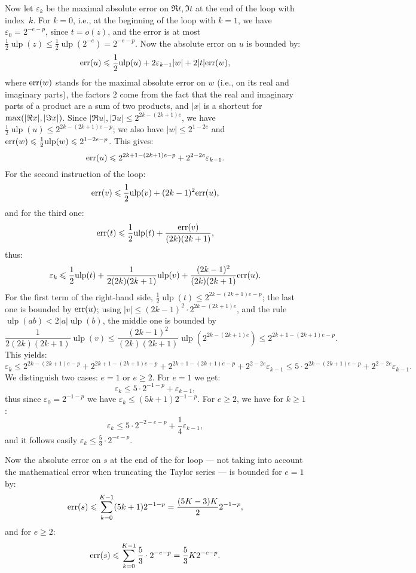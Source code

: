 \documentclass [11pt]{article}
\newcommand {\Ulp}{{\operatorname {ulp}}}
\renewcommand {\leq}{\leqslant}
\renewcommand {\geq}{\geqslant}
\begin{document}
Now let $\varepsilon_k$ be the maximal absolute error on $\Re t, \Im t$ at the
end of the loop with index~$k$.
For $k=0$, i.e., at the beginning of the loop with $k=1$, we have
$\varepsilon_0 = 2^{-e-p}$, since $t = o(z)$, and the error is at most
$\frac{1}{2} \Ulp(z) \leq \frac{1}{2} \Ulp(2^{-e}) = 2^{-e-p}$.
Now the absolute error on $u$ is bounded by:
\[ {\rm err}(u) \leq \frac{1}{2} \Ulp(u) + 2 \varepsilon_{k-1} |w| + 2 |t| {\rm err}(w), \]
where ${\rm err}(w)$ stands for the maximal absolute error on $w$ (i.e.,
on its real and imaginary parts), the factors $2$ come from the fact
that the real and imaginary parts of a product are a sum of two products,
and $|x|$ is a shortcut for ${\rm max}(|\Re x|, |\Im x|)$.
Since $|\Re u|, |\Im u| \leq 2^{2k-(2k+1)e}$, we have
$\frac{1}{2} \Ulp(u) \leq 2^{2k-(2k+1)e-p}$;
we also have $|w| \leq 2^{1-2e}$ and ${\rm err}(w) \leq \frac{1}{2}
\Ulp(w) \leq 2^{1-2e-p}$. This gives:
\[ {\rm err}(u) \leq 2^{2k+1-(2k+1)e-p} + 2^{2-2e} \varepsilon_{k-1}. \]
For the second instruction of the loop:
\[ {\rm err}(v) \leq \frac{1}{2} \Ulp(v) + (2k-1)^2 {\rm err}(u), \]
and for the third one:
\[ {\rm err}(t) \leq \frac{1}{2} \Ulp(t) + \frac{{\rm err}(v)}{(2k)(2k+1)}, \]
thus:
\[ \varepsilon_k \leq \frac{1}{2} \Ulp(t) +
  \frac{1}{2(2k)(2k+1)} \Ulp(v) + \frac{(2k-1)^2}{(2k)(2k+1)} {\rm err}(u). \]
For the first term of the right-hand side,
$\frac{1}{2} \Ulp(t) \leq 2^{2k-(2k+1)e-p}$;
the last one is bounded by ${\rm err}(u)$;
using $|v| \leq (2k-1)^2 \cdot 2^{2k-(2k+1)e}$, and
the rule $\Ulp(ab) < 2 |a| \Ulp(b)$,
the middle one is bounded by
\[ \frac{1}{2(2k)(2k+1)} \Ulp(v) \leq
  \frac{(2k-1)^2}{(2k)(2k+1)} \Ulp(2^{2k-(2k+1)e})
  \leq 2^{2k+1-(2k+1)e-p}. \]
This yields:
\[ \varepsilon_k \leq 2^{2k-(2k+1)e-p} + 2^{2k+1-(2k+1)e-p}
  + 2^{2k+1-(2k+1)e-p} + 2^{2-2e} \varepsilon_{k-1}
  \leq 5 \cdot 2^{2k-(2k+1)e-p} + 2^{2-2e} \varepsilon_{k-1}. \]
We distinguish two cases: $e=1$ or $e \geq 2$.
For $e=1$ we get:
\[ \varepsilon_k \leq 5 \cdot 2^{-1-p} + \varepsilon_{k-1}, \]
thus since $\varepsilon_0 = 2^{-1-p}$ we have
$\varepsilon_k \leq (5k+1) 2^{-1-p}$.
For $e \geq 2$, we have for $k \geq 1$:
\[ \varepsilon_k \leq 5 \cdot 2^{-2-e-p} + \frac{1}{4} \varepsilon_{k-1}, \]
and it follows easily $\varepsilon_k \leq \frac{5}{3} \cdot 2^{-e-p}$.

Now the absolute error on $s$ at the end of the for loop --- not taking into
account the mathematical error when truncating the Taylor series ---
is bounded for $e=1$ by:
\[ {\rm err}(s) \leq \sum_{k=0}^{K-1} (5k+1) 2^{-1-p} = \frac{(5K-3)K}{2} 2^{-1-p}, \]
and for $e \geq 2$:
\[ {\rm err}(s) \leq \sum_{k=0}^{K-1} \frac{5}{3} \cdot 2^{-e-p} =
  \frac{5}{3} K 2^{-e-p}. \]
\end{document}
